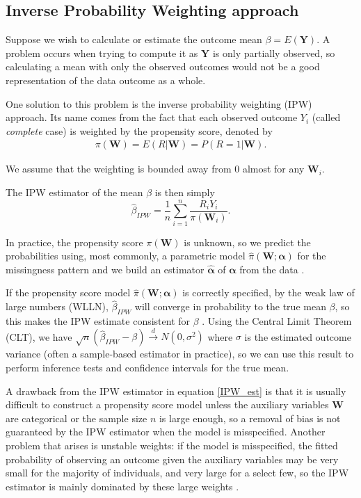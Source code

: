 \documentclass[12pt,twoside]{article}
\begin{document}
\subsection{Inverse Probability Weighting approach}

Suppose we wish to calculate or estimate the outcome mean $\beta = E(\mathbf{Y})$. A problem occurs when trying to compute it as $\mathbf{Y}$ is only partially observed, so calculating a mean with only the observed outcomes would not be a good representation of the data outcome as a whole.

One solution to this problem is the inverse probability weighting (IPW) approach. Its name comes from the fact that each observed outcome $Y_i$ (called \textit{complete} case) is weighted by the propensity score, denoted by
\begin{align*}
    \pi(\mathbf{W})= E(R|\mathbf{W}) = P(R = 1|\mathbf{W}).
\end{align*}

We assume that the weighting is bounded away from 0 almost for any $\mathbf{W}_i$.

The IPW estimator of the mean $\beta$ is then simply 
\begin{equation} \label{IPW_est}
    \hat{\beta}_{IPW} = \frac{1}{n} \sum_{i=1}^{n} \frac{R_iY_i}{\pi(\mathbf{W}_i)}.
\end{equation}

In practice, the propensity score $\pi(\mathbf{W})$ is unknown, so we predict the probabilities using, most commonly, a parametric model $\hat\pi(\mathbf{W}; \boldsymbol\alpha)$ for the missingness pattern and we build an estimator $\hat{\boldsymbol\alpha}$ of $\boldsymbol\alpha$ from the data \citep{vansteelandt}.

If the propensity score model $\hat\pi(\mathbf{W}; \boldsymbol\alpha)$ is correctly specified, by the weak law of large numbers (WLLN), $\hat{\beta}_{IPW}$ will converge in probability to the true mean $\beta$, so this makes the IPW estimate consistent for $\beta$ \citep{davidian}. Using the Central Limit Theorem (CLT), we have $\sqrt{n}(\hat{\beta}_{IPW}-\beta) \xrightarrow{d} N(0,\sigma^2)$ where $\sigma$ is the estimated outcome variance (often a sample-based estimator in practice), so we can use this result to perform inference tests and confidence intervals for the true mean.

A drawback from the IPW estimator in equation \ref{IPW_est} is that it is usually difficult to construct a propensity score model unless the auxiliary variables $\mathbf{W}$ are categorical or the sample size $n$ is large enough, so a removal of bias is not guaranteed by the IPW estimator when the model is misspecified. Another problem that arises is unstable weights: if the model is misspecified, the fitted probability of observing an outcome given the auxiliary variables may be very small for the majority of individuals, and very large for a select few, so the IPW estimator is mainly dominated by these large weights \citep{seaman}.
\end{document}
